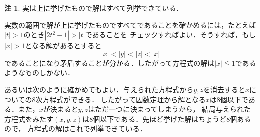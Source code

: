 \documentclass[dvipdfmx,twocolumn,uplatex]{jsarticle}
\theoremstyle{definition}
\newtheorem*{remark}{注}
\begin{document}
\begin{remark}
実は上に挙げたもので解はすべて列挙できている．

実数の範囲で解が上に挙げたものですべてであることを確かめるには，たとえば$|t|>1$のとき$|2t^2-1|>|t|$であることを
チェックすればよい．そうすれば，もし$|x|>1$となる解があるとすると
\[|x|<|y|<|z|<|x| \]
であることになり矛盾することが分かる．したがって方程式の解は$|x|\leqq1$であるようなものしかない．

あるいは次のように確かめてもよい．与えられた方程式から$y,z$を消去すると$x$についての8次方程式ができる．
したがって因数定理から解となる$x$は8個以下である．また，$x$が決まると$y,z$はただ一つに決まってしまうから，
結局与えられた方程式をみたす$(x,y,z)$は8個以下である．先ほど挙げた解はちょうど8個あるので，
方程式の解はこれで列挙できている．
\end{remark}
\end{document}
